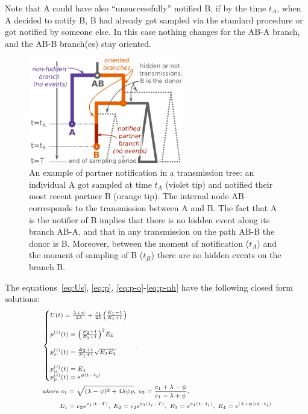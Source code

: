 \documentclass[a4paper,10pt]{article}
\begin{document}
Note that A could have also ``unsuccessfully'' notified B, if by the time $t_A$, when A decided to notify B, B had already got sampled via the standard procedure or got notified by someone else. In this case nothing changes for the AB-A branch, and the AB-B branch(es) stay oriented. 


\begin{figure}[tbhp]
\centering 
\includegraphics[width=0.6\textwidth]{Fig_PNbranches}
\caption{An example of partner notification in a transmission tree: an individual A got sampled at time $t_A$ (violet tip) and notified their most recent partner B (orange tip). The internal node AB corresponds to the transmission between A and B. The fact that A is the notifier of B implies that there is no hidden event along its branch AB-A, and that in any transmission on the path AB-B the donor is B. Moreover, between the moment of notification ($t_A$) and the moment of sampling  of B ($t_B$) there are no hidden events on the branch B.}
\label{fig:pn-branches} 
\end{figure}


The equations~\ref{eq:Us}, \ref{eq:p}, \ref{eq:p-o}-\ref{eq:p-nh} have the following closed form solutions:
\begin{equation}
\scriptsize
\begin{split}
&\begin{cases}
U(t) = \frac{\lambda + \psi}{2\lambda} +  \frac{c_1}{2\lambda}\Big(\frac{E_1 - 1}{E_1 + 1}\Big)\\
\\
p^{(i)}(t) = \Big(\frac{E_2 + 1}{E_1 + 1}\Big)^2E_3 \\
\\
p_o^{(i)}(t) =  \frac{E_2 + 1}{E_1 + 1}\sqrt{E_3E_4} \\
\\
p_n^{(i)}(t) =  E_4
\\
p_p^{(i)}(t) =  e^{\phi (t -t_i)}
\end{cases},\\
& \textit{where } c_1 = \sqrt{(\lambda - \psi)^2 + 4 \lambda\psi\rho},\; c_2 = \frac{c_1 + \lambda - \psi}{c_1 - \lambda + \psi},\\
& ~~~~~~~~E_1 = c_2 e^{c_1 (t -T)},\; E_2 = c_2 e^{c_1 (t_i -T)},\; E_3 = e^{c_1 (t -t_i)}, \; E_4 =  e^{(\lambda + \psi) (t -t_i)}\\
\end{split}\label{eq:ps}
\end{equation}
\end{document}
